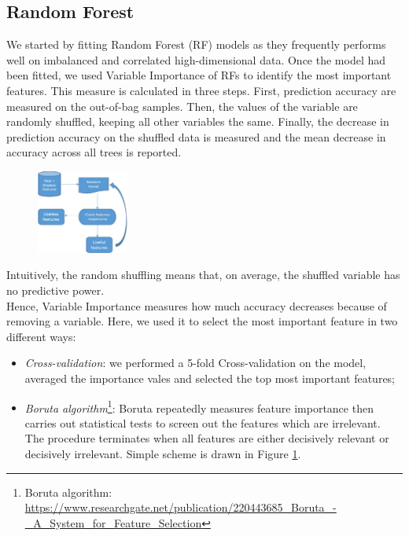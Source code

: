 \documentclass[a4paper,11pt, oneside]{article}  %
\begin{document}
\subsection{Random Forest}
We started by fitting Random Forest (RF) models as they frequently performs well on imbalanced and correlated high-dimensional data.  Once the model had been fitted,  we used Variable Importance of RFs to identify the most important features. This measure is calculated in three steps. First, prediction accuracy are measured on the out-of-bag samples. Then, the values of the variable are randomly shuffled, keeping all other variables the same. Finally, the decrease in prediction accuracy on the shuffled data is measured and the mean decrease in accuracy across all trees is reported. 

\begin{figure}
	\includegraphics[width=0.27\textwidth]{Boruta-Algorithm.jpg}
	\label{fig2}
\end{figure}
Intuitively, the random shuffling means that, on average, the shuffled variable has no predictive power. \\
Hence, Variable Importance measures how much accuracy decreases because of removing a variable. Here, we used it to select the most important feature in two different ways:
\begin{itemize}
	\item \textit{Cross-validation}: we performed a 5-fold Cross-validation on the model, averaged the importance vales and selected the top most important features;
	\item \textit{Boruta algorithm}\footnote{Boruta algorithm: \url{https://www.researchgate.net/publication/220443685_Boruta_-_A_System_for_Feature_Selection}}: Boruta repeatedly measures feature importance then carries out statistical tests to screen out the features which are irrelevant. The procedure terminates when all features are either decisively relevant or decisively irrelevant. Simple scheme is drawn in Figure \ref{fig2}. 
\end{itemize} 
\end{document}
